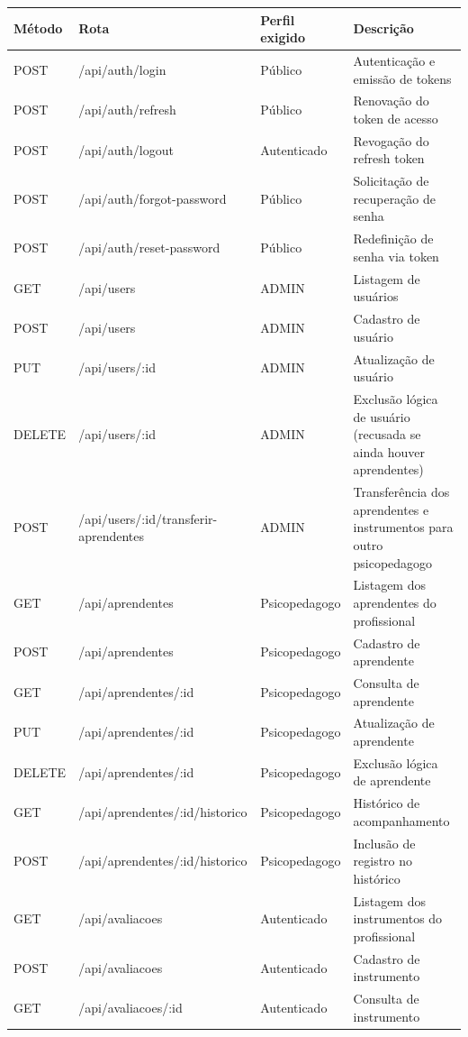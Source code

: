 \begin{quadro}[H]
\centering
\small
\caption{Principais rotas da API REST}
\begin{tabular}{p{1.5cm} p{6cm} p{2.5cm} p{4.5cm}}
\hline
\textbf{Método} & \textbf{Rota} & \textbf{Perfil exigido} & \textbf{Descrição} \\
\hline
POST & /api/auth/login & Público & Autenticação e emissão de tokens \\
POST & /api/auth/refresh & Público & Renovação do token de acesso \\
POST & /api/auth/logout & Autenticado & Revogação do refresh token \\
POST & /api/auth/forgot-password & Público & Solicitação de recuperação de senha \\
POST & /api/auth/reset-password & Público & Redefinição de senha via token \\
\hline
GET  & /api/users & ADMIN & Listagem de usuários \\
POST & /api/users & ADMIN & Cadastro de usuário \\
PUT  & /api/users/:id & ADMIN & Atualização de usuário \\
DELETE & /api/users/:id & ADMIN & Exclusão lógica de usuário (recusada se ainda houver aprendentes) \\
POST & /api/users/:id/transferir-aprendentes & ADMIN & Transferência dos aprendentes e instrumentos para outro psicopedagogo \\
\hline
GET  & /api/aprendentes & Psicopedagogo & Listagem dos aprendentes do profissional \\
POST & /api/aprendentes & Psicopedagogo & Cadastro de aprendente \\
GET  & /api/aprendentes/:id & Psicopedagogo & Consulta de aprendente \\
PUT  & /api/aprendentes/:id & Psicopedagogo & Atualização de aprendente \\
DELETE & /api/aprendentes/:id & Psicopedagogo & Exclusão lógica de aprendente \\
GET  & /api/aprendentes/:id/historico & Psicopedagogo & Histórico de acompanhamento \\
POST & /api/aprendentes/:id/historico & Psicopedagogo & Inclusão de registro no histórico \\
\hline
GET  & /api/avaliacoes & Autenticado & Listagem dos instrumentos do profissional \\
POST & /api/avaliacoes & Autenticado & Cadastro de instrumento \\
GET  & /api/avaliacoes/:id & Autenticado & Consulta de instrumento \\

\end{tabular}
\end{quadro}
